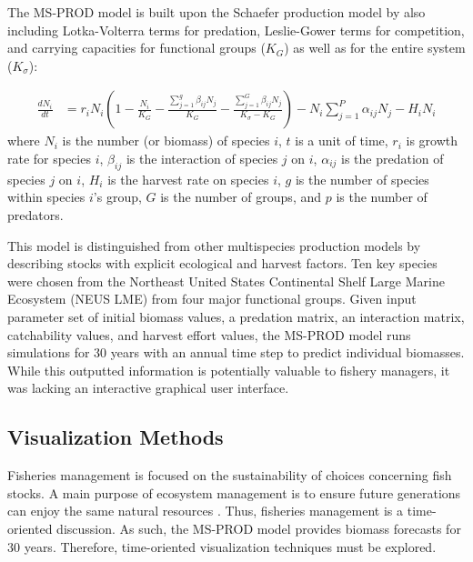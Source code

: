 \documentclass{article}
\begin{document}
The MS-PROD model is built upon the Schaefer production model by also including Lotka-Volterra terms for predation, Leslie-Gower terms for competition, and carrying capacities for functional groups ($K_G$) as well as for the entire system ($K_{\sigma}$):

\begin{align}
\frac{d N_i}{dt} &= r_i N_i \left(1 - \frac{N_i}{K_G} - \frac{\displaystyle\sum\limits_{j=1}^g \beta_{ij} N_j}{K_G} - \frac{\displaystyle\sum\limits_{j=1}^G \beta_{ij} N_j}{K_{\sigma} - K_G}\right) - N_i \displaystyle\sum\limits_{j=1}^P \alpha_{ij} N_j - H_i N_i
\end{align}
where $N_i$ is the number (or biomass) of species $i$, $t$ is a unit of time, $r_i$ is growth rate for species $i$, $\beta_{ij}$ is the interaction of species $j$ on $i$, $\alpha_{ij}$ is the predation of species $j$ on $i$, $H_i$ is the harvest rate on species $i$, $g$ is the number of species within species $i$'s group, $G$ is the number of groups, and $p$ is the number of predators.

This model is distinguished from other multispecies production models by describing stocks with explicit ecological and harvest factors.  Ten key species were chosen from the Northeast United States Continental Shelf Large Marine Ecosystem (NEUS LME) from four major functional groups.  Given input parameter set of initial biomass values, a predation matrix, an interaction matrix, catchability values, and harvest effort values, the MS-PROD model runs simulations for 30 years with an annual time step to predict individual biomasses.  While this outputted information is potentially valuable to fishery managers, it was lacking an interactive graphical user interface.  

\subsection{Visualization Methods}

Fisheries management is focused on the sustainability of choices concerning fish stocks.  A main purpose of ecosystem management is to ensure future generations can enjoy the same natural resources \cite{Christensen1996Report}.  Thus, fisheries management is a time-oriented discussion.  As such, the MS-PROD model provides biomass forecasts for 30 years.  Therefore, time-oriented visualization techniques must be explored.
\end{document}
